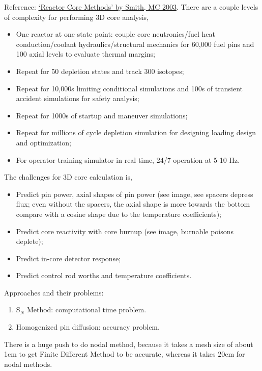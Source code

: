 \documentclass{school-22.211-notes}
\date{May  2, 2012}
\begin{document}
\maketitle

Reference: \href{www.oecd-nea.org/dbprog/documents/MC03Smith.pdf}{`Reactor Core Methods' by Smith, MC 2003}. 
There are a couple levels of complexity for performing 3D core analysis,
\begin{itemize}
\item One reactor at one state point: couple core neutronics/fuel heat conduction/coolant hydraulics/structural mechanics for 60,000 fuel pins and 100 axial levels to evaluate thermal margins;
\item Repeat for 50 depletion states and track 300 isotopes;
\item Repeat for 10,000s limiting conditional simulations and 100s of transient accident simulations for safety analysis;
\item Repeat for 1000s of startup and maneuver simulations;
\item Repeat for millions of cycle depletion simulation for designing loading design and optimization;
\item For operator training simulator in real time, 24/7 operation at 5-10 Hz. 
\end{itemize}
The challenges for 3D core calculation is,
\begin{itemize}
\item Predict pin power, axial shapes of pin power (see image, see spacers depress flux; even without the spacers, the axial shape is more towards the bottom compare with a cosine shape due to the temperature coefficients); 
\item Predict core reactivity with core burnup (see image, burnable poisons deplete);
\item Predict in-core detector response;
\item Predict control rod worths and temperature coefficients. 
\end{itemize}
Approaches and their problems:
\begin{enumerate}
\item S$_N$ Method: computational time problem. 
\item Homogenized pin diffusion: accuracy problem. 
\end{enumerate}
There is a huge push to do nodal method, because it takes a mesh size of about 1cm to get Finite Different Method to be accurate, whereas it takes 20cm for nodal methods. 
\end{document}
